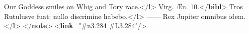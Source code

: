 \begin{shaded}
\hspace*{1em}\hspace*{1em}Our Goddess smiles on Whig and Tory race.{</\textbf{l}>}\mbox{}\newline 
\hspace*{1em}\mbox{}\newline 
{}\mbox{}\newline 
{}Virg. Æn. 10.{</\textbf{bibl}>}\mbox{}\newline 
{}\mbox{}\newline 
\hspace*{1em}Tros Rutulusve fuat; nullo discrimine habebo.{</\textbf{l}>}\mbox{}\newline 
\hspace*{1em}—— Rex Jupiter omnibus idem. {</\textbf{l}>}\mbox{}\newline 
{}\mbox{}\newline 
{</\textbf{note}>}\mbox{}\newline 
{<\textbf{link}\hspace*{1em}{target}="{\#n3.284 \#L3.284}"/>}\end{shaded}\egroup\par \noindent  \par
